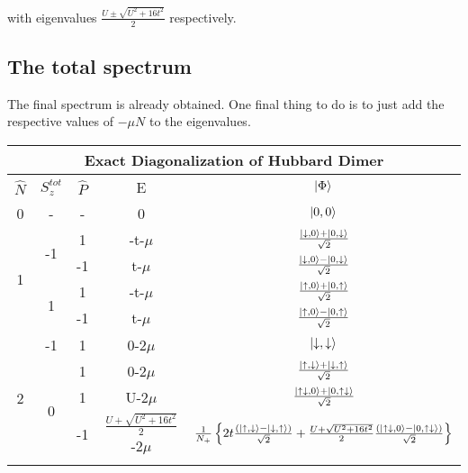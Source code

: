 \documentclass[12pt]{article}
\begin{document}
with eigenvalues \(\frac{U\pm\sqrt{U^2+16 t^2}}{2}\) respectively.
\subsection{The total spectrum}
The final spectrum is already obtained. One final thing to do is to just add the respective values of \(-\mu N\) to the eigenvalues.
\begin{center}
\begin{tabular}{@{}ccccc@{}}
\toprule
\multicolumn{5}{c}{\bf{Exact Diagonalization of Hubbard Dimer}} \\
\toprule
\(\hat{N}\) & \(S_z^{tot}\) & \(\hat{P}\) & E & \(\ket{\Phi}\)\\
\toprule
0 & - & - & 0 & \(\ket{0,0}\) \\ \toprule
\multicolumn{1}{c}{\multirow{4}{*}{1}} & \multirow{2}{*}{-1} & 1  & -t-\(\mu\)  & \(\frac{\ket{\downarrow,0}+\ket{0,\downarrow}}{\sqrt{2}}\)  \\ \cmidrule(l){3-5} 
\multicolumn{1}{c}{}                   &                     & -1 & t-\(\mu\)   & \(\frac{\ket{\downarrow,0}-\ket{0,\downarrow}}{\sqrt{2}}\)  \\ \cmidrule(l){2-5}
\multicolumn{1}{c}{}                   & \multirow{2}{*}{1}  & 1  & -t-\(\mu\)  & \(\frac{\ket{\uparrow,0}+\ket{0,\uparrow}}{\sqrt{2}}\)  \\ \cmidrule(l){3-5} 
\multicolumn{1}{c}{}                   &                     & -1 & t-\(\mu\)   & \(\frac{\ket{\uparrow,0}-\ket{0,\uparrow}}{\sqrt{2}}\)  \\ \toprule
\multirow{6}{*}{2}                     & -1                  & 1  & 0-\(2\mu\)   & \(\ket{\downarrow,\downarrow}\)  \\ \cmidrule(l){2-5} 
                                       & \multirow{4}{*}{0}  & 1  & 0-\(2\mu\)   & \(\frac{\ket{\uparrow,\downarrow}+\ket{\downarrow,\uparrow}}{\sqrt{2}}\)  \\ \cmidrule(l){3-5} 
                                       &                     & 1  & U-\(2\mu\)   & \(\frac{\ket{\uparrow\downarrow,0}+\ket{0,\uparrow\downarrow}}{\sqrt{2}}\)  \\ \cmidrule(l){3-5} 
                                       &                     & -1 & \(\frac{U+\sqrt{U^2+16 t^2}}{2}\)-\(2\mu\)    & \(\frac{1}{N_+}\left\{{2t \frac{(\ket{\uparrow,\downarrow}-\ket{\downarrow,\uparrow})}{\sqrt{2}} + \frac{U+\sqrt{U^2+16 t^2}}{2} \frac{(\ket{\uparrow\downarrow,0}-\ket{0,\uparrow\downarrow})}{\sqrt{2}}}\right\}\)  \\ \cmidrule(l){3-5} 

\end{tabular}
\end{center}
\end{document}
